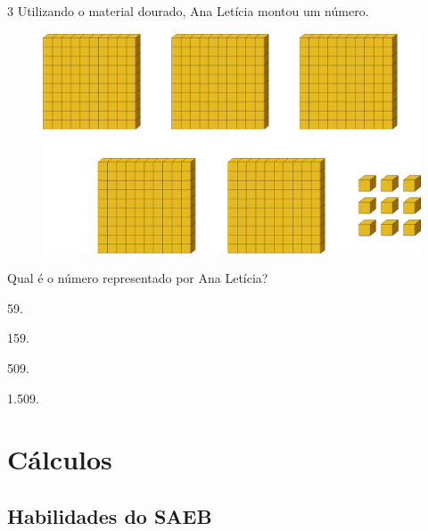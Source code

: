 \num{3} Utilizando o material dourado, Ana Letícia montou um número.

\begin{figure}[htpb!]
\centering
\includegraphics[width=\textwidth]{./media/image9.png}
\end{figure}

Qual é o número representado por Ana Letícia? 

\begin{escolha}
  \begin{multicols}{2}
\item
  59.
\item
  159.
\item
  509.
\item
  1.509.
  \end{multicols}
\end{escolha}

\chapter{Cálculos}

\section*{Habilidades do SAEB}

